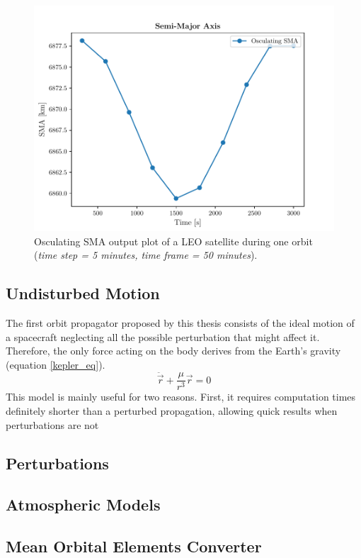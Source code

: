 \begin{figure}[h]
      \centering
      \includegraphics[scale=0.9]{img/time_step.pdf}
      \caption{Osculating SMA output plot of a LEO satellite during one orbit (\textit{time step = 5 minutes, time frame = 50 minutes}).}
      \label{time_step_fig}
  \end{figure}

\subsection{Undisturbed Motion}
The first orbit propagator proposed by this thesis consists of the ideal motion of a spacecraft neglecting all the possible perturbation that might affect it.
Therefore, the only force acting on the body derives from the Earth's gravity (equation \ref{kepler_eq}).
\begin{equation} \label{kepler_eq}
      \ddot{\vec{r}} + \frac{\mu}{r^3}\vec{r} = 0
\end{equation}
This model is mainly useful for two reasons.
First, it requires computation times definitely shorter than a perturbed propagation, allowing quick results when perturbations are not 


\subsection{Perturbations}
\subsection{Atmospheric Models}
\subsection{Mean Orbital Elements Converter}
